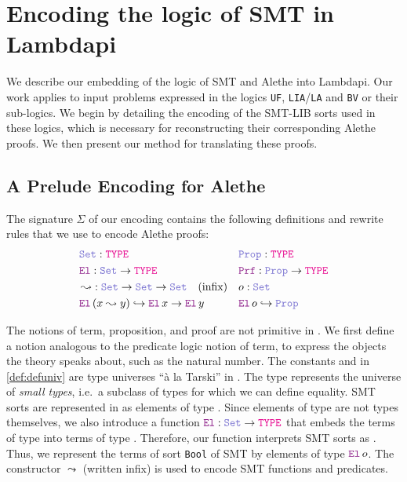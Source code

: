 
\chapter{Encoding the logic of SMT in Lambdapi} \label{ch:encoding}

We describe our embedding of the logic of SMT and Alethe into Lambdapi.
Our work applies to input problems expressed in the logics \texttt{UF}, \texttt{LIA}/\texttt{LA} and \texttt{BV} or their sub-logics.
We begin by detailing the encoding of the SMT-LIB sorts used in these logics, which is necessary for reconstructing their corresponding Alethe proofs.
We then present our method for translating these proofs.

\section{A Prelude Encoding for Alethe}
\label{sec:encoding-prelude}

\begin{definition}
\label{def:defuniv}
The signature $\Sigma$ of our encoding contains the following definitions and rewrite rules that we use to encode Alethe proofs:
\begin{align*}
&\set\index{\set}: \type & &\prop\index{\prop}: \type \\
&\index{\el{}} \el{}: \set \rightarrow \type  & &\index{\prf}\prf{} : \prop \rightarrow \type \\
&\mathop{\leadsto}\index{$\leadsto$}: \set \rightarrow \set \rightarrow \set \quad \text{(infix)} & &o: \set \\
&\el\,(x \leadsto y) \hookrightarrow \el\,x \rightarrow \el\,y & &\el\,o\index{o}  \hookrightarrow \prop
\end{align*}
\end{definition}

The notions of term, proposition, and proof are not primitive in \lpm.
We ﬁrst deﬁne a notion analogous to the predicate logic notion of term, to express the objects the theory speaks about, such as the natural number.
The constants \set{} and \prop{} in \cref{def:defuniv} are type universes ``à la Tarski'' \cite[\S Universes]{intuitype} in \lpm.
The type \set{} represents the universe of \textit{small types}, i.e.\ a subclass of types for which we can define equality.
SMT sorts are represented in \lpm{} as elements of type \set{}. Since elements of type \set{} are not types themselves,
we also introduce a function $\el: \set \rightarrow \type$ that embeds the terms of type \set{} into terms of type \type.
Therefore, our function \el{} interprets SMT sorts as \type.
Thus, we represent the terms of sort \lstinline[language=SMT,basicstyle=\ttfamily\normalsize]|Bool| of SMT by elements of type $\el{}\,o$.
The constructor $\leadsto$ (written infix) is used to encode SMT functions and predicates.

